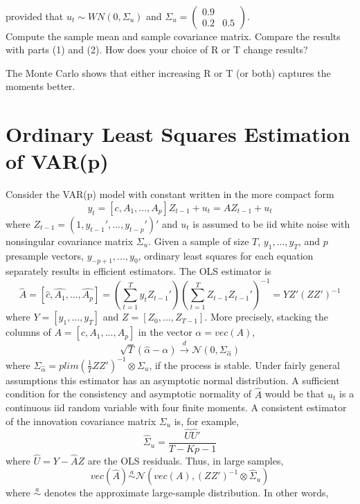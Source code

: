 \documentclass[a4paper]{scrartcl}
\begin{document}
\begin{enumerate}
\begin{align*}
	\end{align*}
	provided that $u_t \sim WN(0,\Sigma_u)$ and $\Sigma_u = \begin{pmatrix}0.9 &  \\ 0.2 & 0.5 \end{pmatrix}$. \\Compute the sample mean and sample covariance matrix. Compare the results with parts (1) and (2). How does your choice of R or T change results?
	\begin{solution}
	
	The Monte Carlo shows that either increasing R or T (or both) captures the moments better.
	\end{solution}
\end{enumerate}
\newpage

\section{Ordinary Least Squares Estimation of VAR(p)}
Consider the VAR(p) model with constant written in the more compact form
$$ y_t = [c, A_1, ..., A_p] Z_{t-1} + u_t = A Z_{t-1}+ u_t$$
where $Z_{t-1}=(1,y_{t-1}',...,y_{t-p}')'$ and $u_t$ is assumed to be iid white noise with nonsingular covariance matrix $\Sigma_u$. Given a sample of size $T$, $y_1,...,y_T$, and $p$ presample vectors, $y_{-p+1},...,y_{0}$, ordinary least squares for each equation separately results in efficient estimators. The OLS estimator is
$$\hat{A} = \left[ \hat{c}, \hat{A_1},...,\hat{A_p}\right] = \left(\sum_{t=1}^{T}y_t Z_{t-1}'\right)\left(\sum_{t=1}^{T}Z_{t-1}Z_{t-1}'\right)^{-1} = Y Z'(ZZ')^{-1}$$
where $Y=[y_1,...,y_T]$ and $Z=[Z_0,...,Z_{T-1}]$. More precisely, stacking the columns of $A = [c, A_1,...,A_p]$ in the vector $\alpha = vec(A)$,
$$\sqrt{T}\left(\hat{\alpha} - \alpha \right) \overset{d}{\rightarrow} \mathcal{N}(0, \Sigma_{\hat{\alpha}})$$
where $\Sigma_{\hat{\alpha}} = plim(\frac{1}{T}ZZ')^{-1}\otimes \Sigma_u$, if the process is stable. Under fairly general assumptions this estimator has an asymptotic normal distribution. A sufficient condition for the consistency and asymptotic normality of $\hat{A}$ would be that $u_t$ is a continuous iid random variable with four finite moments. A consistent estimator of the innovation covariance matrix $\Sigma_u$ is, for example,
$$\hat{\Sigma}_u = \frac{\hat{U}\hat{U}'}{T-Kp-1}$$
where $\hat{U} = Y - \hat{A}Z$ are the OLS residuals. Thus, in large samples,
$$vec(\hat{A}) \overset{a}{\sim}\mathcal{N}(vec(A),(ZZ')^{-1}\otimes \hat{\Sigma}_u)$$
where $\overset{a}{\sim}$  denotes the approximate large-sample distribution. In other words,
\end{document}
